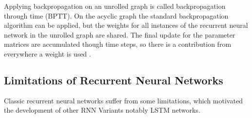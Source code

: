 \documentclass[twoside,a4paper,10pt,DIV=12,BCOR=12mm]{scrartcl}
\begin{document}
\begin{center}
  \label{fig:rnn_unroll}
\end{center}




Applying backpropagation on an unrolled graph is called backpropagation through time (BPTT). On the acyclic graph 
the standard backpropagation algorithm can be applied, but the weights for all instances of the recurrent neural network
in the unrolled graph are shared. The final update for the parameter matrices are accumulated though time steps, so there 
is a contribution from everywhere a weight is used \cite{werb1990bptt}.


\subsection{Limitations of Recurrent Neural Networks}

Classic recurrent neural networks suffer from some limitations, which motivated the development 
of other RNN Variants notably LSTM networks.
\end{document}

